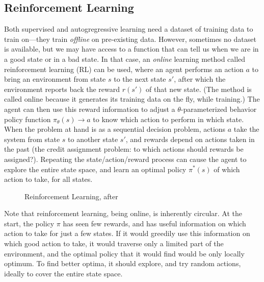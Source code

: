 \subsection{Reinforcement Learning} 
\label{sec:sdp}\label{sec:rl}
Both supervised and autogregressive learning need a dataset of training data to train on---they train {\em offline} on pre-existing data. However, sometimes no dataset is available, but we may have access to a function that can tell us when we are in a good state or in a bad state. In that case, an {\em online} learning method called reinforcement learning (RL) can be used, where an agent performs an action $a$ to bring an environment from state $s$ to the next state $s'$, after which the environment reports back the reward $r(s')$ of that new state. (The method is called online because it generates its training data on the fly, while training.)  The agent can then use this reward information to adjust a $\theta$-parameterized behavior policy function $\pi_\theta(s) \rightarrow a$ to know which action to perform in which state. When the problem at hand is as a sequential decision problem,  actions $a$ take the system from state $s$ to another state $s'$, and rewards depend on actions taken in the past (the credit assignment problem: to which actions should rewards be assigned?). Repeating the state/action/reward  process can cause  the agent to explore the entire state space, and  learn an optimal policy $\pi^*(s)$ of which action to take, for all states. %

\begin{figure}[tb]
  \begin{center}
    
    \caption{Reinforcement Learning, after \citet{sutton2018reinforcement}}\label{fig:rl-org}
  \end{center}
\end{figure}

Note that reinforcement learning, being online,  is inherently circular. At the start, the policy $\pi$ has seen few rewards, and has useful information on which action to take for just a few states. If it would greedily use this information on which good action to take, it would  traverse only a limited part of the environment, and the optimal policy that it would find would be only locally optimum. To find better optima, it should explore, and try random actions, ideally to cover the entire state space. 

